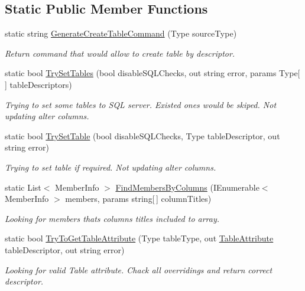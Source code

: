 \subsection*{Static Public Member Functions}
\begin{DoxyCompactItemize}
\item 
static string \mbox{\hyperlink{class_uniform_data_operator_1_1_sql_1_1_markup_1_1_table_attribute_aca369c412ca492ccb2937c8a129f7802}{Generate\+Create\+Table\+Command}} (Type source\+Type)
\begin{DoxyCompactList}\small\item\em Return command that would allow to create table by descriptor. \end{DoxyCompactList}\item 
static bool \mbox{\hyperlink{class_uniform_data_operator_1_1_sql_1_1_markup_1_1_table_attribute_a2efef1ffee6dc4329d9b2359513ae41a}{Try\+Set\+Tables}} (bool disable\+S\+Q\+L\+Checks, out string error, params Type\mbox{[}$\,$\mbox{]} table\+Descriptors)
\begin{DoxyCompactList}\small\item\em Trying to set some tables to S\+QL server. Existed ones would be skiped. Not updating alter columns. \end{DoxyCompactList}\item 
static bool \mbox{\hyperlink{class_uniform_data_operator_1_1_sql_1_1_markup_1_1_table_attribute_a5da0c0409e593c08ff76a5245dcdb904}{Try\+Set\+Table}} (bool disable\+S\+Q\+L\+Checks, Type table\+Descriptor, out string error)
\begin{DoxyCompactList}\small\item\em Trying to set table if required. Not updating alter columns. \end{DoxyCompactList}\item 
static List$<$ Member\+Info $>$ \mbox{\hyperlink{class_uniform_data_operator_1_1_sql_1_1_markup_1_1_table_attribute_a10f9e13016b88c06908c4bf0d5dac4b9}{Find\+Members\+By\+Columns}} (I\+Enumerable$<$ Member\+Info $>$ members, params string\mbox{[}$\,$\mbox{]} column\+Titles)
\begin{DoxyCompactList}\small\item\em Looking for members that\textquotesingle{}s column\textquotesingle{}s titles included to array. \end{DoxyCompactList}\item 
static bool \mbox{\hyperlink{class_uniform_data_operator_1_1_sql_1_1_markup_1_1_table_attribute_ace5105a7193faa48f53f32ce58a2a58c}{Try\+To\+Get\+Table\+Attribute}} (Type table\+Type, out \mbox{\hyperlink{class_uniform_data_operator_1_1_sql_1_1_markup_1_1_table_attribute}{Table\+Attribute}} table\+Descriptor, out string error)
\begin{DoxyCompactList}\small\item\em Looking for valid Table attribute. Chack all overridings and return correct descriptor. \end{DoxyCompactList}\end{DoxyCompactItemize}
